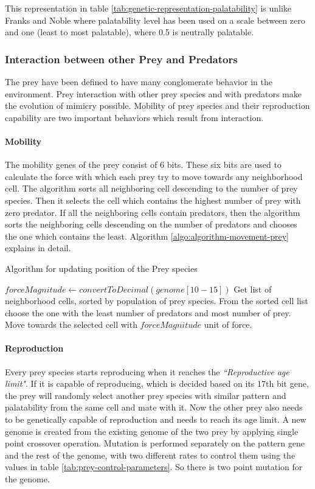 \documentclass[letterpaper]{article}
\numberwithin{equation}{section}
\begin{document}
This representation in table \ref{tab:genetic-representation-palatability} is unlike Franks and Noble \cite{franks2003} where palatability level has been used on a scale between zero and one (least to most palatable), where 0.5 is neutrally palatable. 

\subsubsection{Interaction between other Prey and Predators}
The prey have been defined to have many conglomerate behavior in the environment. Prey interaction with other prey species and with predators make the evolution of mimicry possible. Mobility of prey species and their reproduction capability are two important behaviors which result from interaction. 

\paragraph{Mobility}
The mobility genes of the prey consist of 6 bits. These six bits are used to calculate the force with which each prey try to move towards any neighborhood cell. The algorithm sorts all neighboring cell descending to the number of prey species. Then it selects the cell which contains the highest number of prey with zero predator. If all the neighboring cells contain predators, then the algorithm sorts the neighboring cells descending on the number of predators and chooses the one which contains the least. Algorithm \ref{algo:algorithm-movement-prey} explains in detail.

\begin{algorithm}[H]
	\caption{Algorithm for updating position of the Prey species}
	\label{algo:algorithm-movement-prey}
	\begin{algorithmic}
			\STATE $forceMagnitude \gets convertToDecimal(genome[10-15])$
			\STATE Get list of neighborhood cells, sorted by population of prey species.
			\STATE From the sorted cell list choose the one with the least number of predators and most number of prey.
			\STATE Move towards the selected cell with $forceMagnitude$ unit of force.
		\ENDFOR
	\end{algorithmic}
\end{algorithm}

\paragraph{Reproduction}
Every prey species starts reproducing when it reaches the \textsl{``Reproductive age limit"}. If it is capable of reproducing, which is decided based on its 17th bit gene, the prey will randomly select another prey species with similar pattern and palatability from the same cell and mate with it. Now the other prey also needs to be genetically capable of reproduction and needs to reach its age limit. A new genome is created from the existing genome of the two prey by applying single point crossover operation. Mutation is performed separately on the pattern gene and the rest of the genome, with two different rates to control them using the values in table \ref{tab:prey-control-parameters}. So there is two point mutation for the genome. 
\end{document}
